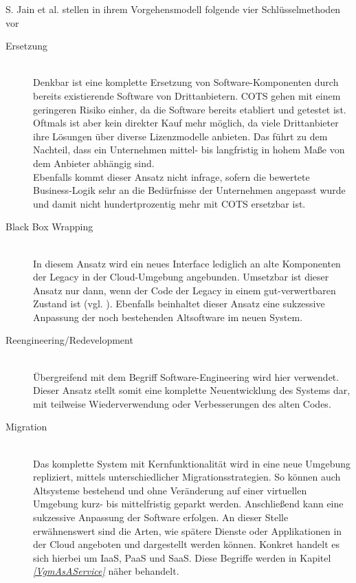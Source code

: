 S. Jain et al. stellen in ihrem Vorgehensmodell folgende vier Schlüsselmethoden vor
\begin{description}   
 \item [Ersetzung] \hfill \\
 Denkbar ist eine komplette Ersetzung von Software-Komponenten durch bereits existierende Software von Drittanbietern. COTS \cite{cots} gehen mit einem geringeren Risiko einher, da die Software bereits etabliert und getestet ist. Oftmals ist aber kein direkter Kauf mehr möglich, da viele Drittanbieter ihre Lösungen über diverse Lizenzmodelle anbieten. Das führt zu dem Nachteil, dass ein Unternehmen mittel- bis langfristig in hohem Maße von dem Anbieter abhängig sind. \\Ebenfalls kommt dieser Ansatz nicht infrage, sofern die bewertete Business-Logik sehr an die Bedürfnisse der Unternehmen angepasst wurde und damit nicht hundertprozentig mehr mit COTS ersetzbar ist.
 
 \item [Black Box Wrapping] \hfill \\
 In diesem Ansatz wird ein neues Interface lediglich an alte Komponenten der Legacy in der Cloud-Umgebung angebunden. Umsetzbar ist dieser Ansatz nur dann, wenn der Code der Legacy in einem gut-verwertbaren Zustand ist (vgl. ). Ebenfalls beinhaltet dieser Ansatz eine sukzessive Anpassung der noch bestehenden Altsoftware im neuen System.
 \item [Reengineering/Redevelopment] \hfill \\
 Übergreifend mit dem Begriff Software-Engineering wird hier verwendet. Dieser Ansatz stellt somit eine komplette Neuentwicklung des Systems dar, mit teilweise Wiederverwendung oder Verbesserungen des alten Codes.
 \item [Migration] \hfill \\
\textit{} Das komplette System mit Kernfunktionalität wird in eine neue Umgebung repliziert, mittels unterschiedlicher Migrationsstrategien. So können auch Altsysteme bestehend und ohne Veränderung auf einer virtuellen Umgebung kurz- bis mittelfristig geparkt werden. Anschließend kann eine sukzessive Anpassung der Software erfolgen. An dieser Stelle erwähnenswert sind die Arten, wie spätere Dienste oder Applikationen in der Cloud angeboten und dargestellt werden können. Konkret handelt es sich hierbei um \ac{IaaS}, \ac{PaaS} und \ac{SaaS}. Diese Begriffe werden in Kapitel \textit{\ref{VgmAsAService} } näher behandelt.
\end{description}   


